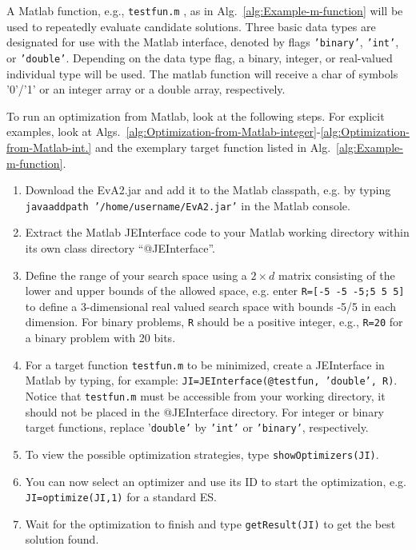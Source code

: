 A Matlab function, e.g., \texttt{testfun.m} , as in Alg.~\ref{alg:Example-m-function}
will be used to repeatedly evaluate candidate solutions. Three basic
data types are designated for use with the Matlab interface, denoted
by flags \texttt{'binary'}, \texttt{'int'}, or \texttt{'double'}.
Depending on the data type flag, a binary, integer, or real-valued
individual type will be used. The matlab function will receive a char
of symbols '0'/'1' or an integer array or a double array, respectively. 

To run an optimization from Matlab, look at the following steps. For
explicit examples, look at Algs.~\ref{alg:Optimization-from-Matlab-integer}-\ref{alg:Optimization-from-Matlab-int.}
and the exemplary target function listed in Alg.~\ref{alg:Example-m-function}.
\begin{enumerate}
\item Download the EvA2.jar and add it to the Matlab classpath, e.g.
by typing \texttt{javaaddpath '/home/username/EvA2.jar'} in the
Matlab console.
\item Extract the Matlab JEInterface code to your Matlab working directory
within its own class directory ``@JEInterface''.
\item Define the range of your search space using a $2\times d$ matrix
consisting of the lower and upper bounds of the allowed space, e.g.
enter \texttt{R={[}-5 -5 -5;5 5 5{]}} to define a 3-dimensional real
valued search space with bounds -5/5 in each dimension. For binary
problems, \texttt{R} should be a positive integer, e.g., \texttt{R=20}
for a binary problem with 20 bits.
\item For a target function \texttt{testfun.m} to be minimized, create a
JEInterface in Matlab by typing, for example: \texttt{JI=JEInterface(@testfun,
'double', R)}. Notice that \texttt{testfun.m} must be accessible from
your working directory, it should not be placed in the @JEInterface
directory. For integer or binary target functions, replace '\texttt{double'}
by \texttt{'int'} or \texttt{'binary'}, respectively.
\item To view the possible optimization strategies, type \texttt{showOptimizers(JI)}.
\item You can now select an optimizer and use its ID to start the optimization,
e.g. \texttt{JI=op\-ti\-mize\-(JI,1)} for a standard ES.
\item Wait for the optimization to finish and type \texttt{getResult(JI)}
to get the best solution found.
\end{enumerate}


